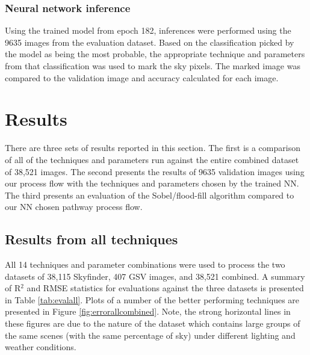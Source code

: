 \documentclass[final,3p,times,authoryear]{elsarticle}
\begin{document}
\subsubsection{Neural network inference}\label{sec:nninference}    
Using the trained model from epoch 182, inferences were performed using the 9635 images from the evaluation dataset. Based on the classification picked by the model as being the most probable, the appropriate technique and parameters from that classification was used to mark the sky pixels. The marked image was compared to the validation image and accuracy calculated for each image.

\section{Results}\label{sec:results}


There are three sets of results reported in this section. The first is a comparison of all of the techniques and parameters run against the entire combined dataset of 38,521 images. The second presents the results of 9635  validation images using our process flow with the techniques and parameters chosen by the trained NN. The third presents an evaluation of the Sobel/flood-fill algorithm compared to our NN chosen pathway process flow.

\subsection{Results from all techniques}\label{sec:resultsall}
All 14 techniques and parameter combinations were used to process the two datasets of 38,115 Skyfinder, 407 GSV images, and 38,521 combined. A summary of R$^{2}$ and RMSE statistics for evaluations against the three datasets is presented in Table \ref{tab:evalall}. Plots of a number of the better performing techniques are presented in Figure \ref{fig:errorallcombined}. Note, the strong horizontal lines in these figures are due to the nature of the dataset which contains large groups of the same scenes (with the same percentage of sky) under different lighting and weather conditions.
\end{document}
